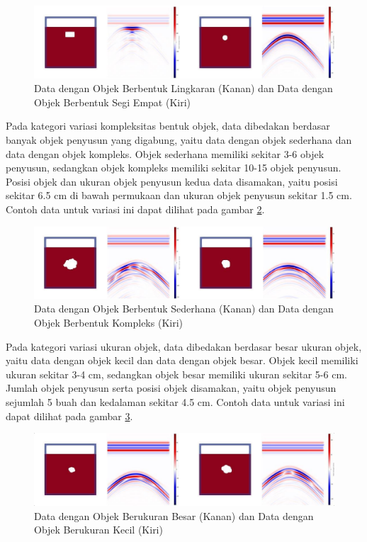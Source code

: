 \begin{figure}[ht]
  \centering
  \includegraphics[scale=0.4]{gambar/variasi reguler.png}
  \caption{Data dengan Objek Berbentuk Lingkaran (Kanan) dan Data dengan Objek Berbentuk Segi Empat (Kiri)}
  \label{fig:regularData}
\end{figure}

Pada kategori variasi kompleksitas bentuk objek, data dibedakan berdasar banyak objek penyusun yang digabung, yaitu data dengan objek sederhana dan data dengan objek kompleks. 
Objek sederhana memiliki sekitar 3-6 objek penyusun, sedangkan objek kompleks memiliki sekitar 10-15 objek penyusun. 
Posisi objek dan ukuran objek penyusun kedua data disamakan, yaitu posisi sekitar 6.5 cm di bawah permukaan dan ukuran objek penyusun sekitar 1.5 cm. 
Contoh data untuk variasi ini dapat dilihat pada gambar \ref{fig:kompleksData}.

\begin{figure}[ht]
  \centering
  \includegraphics[scale=0.4]{gambar/variasi kompleksitas.png}
  \caption{Data dengan Objek Berbentuk Sederhana (Kanan) dan Data dengan Objek Berbentuk Kompleks (Kiri)}
  \label{fig:kompleksData}
\end{figure}

Pada kategori variasi ukuran objek, data dibedakan berdasar besar ukuran objek, yaitu data dengan objek kecil dan data dengan objek besar. 
Objek kecil memiliki ukuran sekitar 3-4 cm, sedangkan objek besar memiliki ukuran sekitar 5-6 cm. 
Jumlah objek penyusun serta posisi objek disamakan, yaitu objek penyusun sejumlah 5 buah dan kedalaman sekitar 4.5 cm. 
Contoh data untuk variasi ini dapat dilihat pada gambar \ref{fig:ukuranData}.

\begin{figure}[ht]
  \centering
  \includegraphics[scale=0.4]{gambar/variasi ukuran.png}
  \caption{Data dengan Objek Berukuran Besar (Kanan) dan Data dengan Objek Berukuran Kecil (Kiri)}
  \label{fig:ukuranData}
\end{figure}

